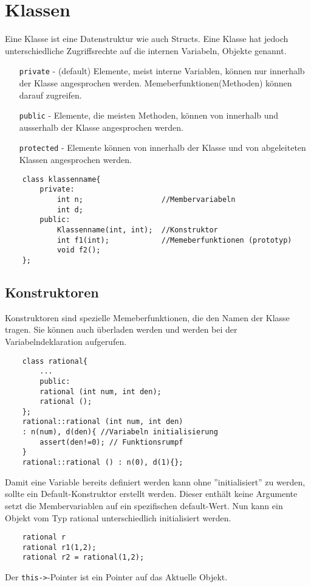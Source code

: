 \section{Klassen}
Eine Klasse ist eine Datenstruktur wie auch Structs. Eine Klasse hat jedoch unterschiedliche Zugriffsrechte auf die internen Variabeln, Objekte genannt.
\begin{itemize}
	\item[\texttt{private}] - (default) Elemente, meist interne Variablen, können nur innerhalb der Klasse angesprochen werden. Memeberfunktionen(Methoden) können darauf zugreifen. 
	\item[\texttt{public}] - Elemente, die meisten Methoden, können von innerhalb und ausserhalb der Klasse angesprochen werden.
	\item[\texttt{protected}] - Elemente können von innerhalb der Klasse und von abgeleiteten Klassen angesprochen werden.
\end{itemize}
\begin{lstlisting}
	class klassenname{
		private:
			int n;					//Membervariabeln
			int d;
		public:
			Klassenname(int, int);	//Konstruktor
			int f1(int);			//Memeberfunktionen (prototyp)
			void f2();
	};
\end{lstlisting}
\subsection{Konstruktoren}
Konstruktoren sind spezielle Memeberfunktionen, die den Namen der Klasse tragen. Sie können auch überladen werden und werden bei der Variabelndeklaration aufgerufen.
\begin{lstlisting}
	class rational{
		...
		public:
		rational (int num, int den);
		rational ();
	};
	rational::rational (int num, int den)
	: n(num), d(den){ //Variabeln initialisierung
		assert(den!=0); // Funktionsrumpf
	}
	rational::rational () : n(0), d(1){};
\end{lstlisting}
Damit eine Variable bereits definiert werden kann ohne ''initialisiert'' zu werden, sollte ein Default-Konstruktor erstellt werden. Dieser enthält keine Argumente setzt die Membervariablen auf ein spezifischen default-Wert. Nun kann ein Objekt vom Typ rational unterschiedlich initialisiert werden. 
\begin{lstlisting}
	rational r
	rational r1(1,2);
	rational r2 = rational(1,2);
\end{lstlisting}
Der \texttt{this->}-Pointer ist ein Pointer auf das Aktuelle Objekt.



